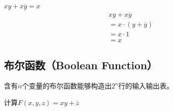 \begin{tcolorbox}
	$ xy + x \overline y = x $
	\begin{align}
		 & xy + x \overline y          \\
		 & = x \cdot (y + \overline y) \\
		 & = x \cdot 1                 \\
		 & = x
	\end{align}
\end{tcolorbox}

\vspace{0.5cm}

\subsection{布尔函数（Boolean Function）}

含有$ n $个变量的布尔函数能够构造出$ 2^n $行的输入输出表。

\begin{tcolorbox}
	计算$ F(x, y, z) = xy + \overline z $
	\begin{table}[H]
		\centering
	\end{table}
\end{tcolorbox}

